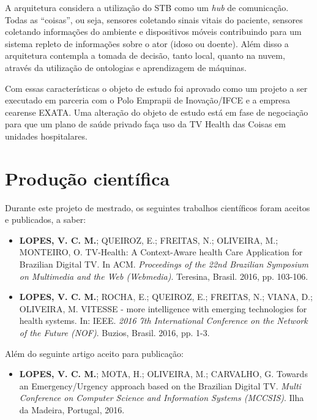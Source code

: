 A arquitetura considera a utilização do STB como um \textit{hub} de
comunicação. Todas as ``coisas'', ou seja, sensores coletando sinais vitais do
paciente, sensores coletando informações do ambiente e dispositivos móveis
contribuindo para um sistema repleto de informações sobre o ator (idoso
ou doente). Além disso a arquitetura contempla a tomada de decisão, tanto
local, quanto na nuvem, através da utilização de ontologias e aprendizagem de
máquinas.

Com essas características o objeto de estudo foi aprovado como um
projeto a ser executado em parceria com o Polo Emprapii de Inovação/IFCE e
a empresa cearense EXATA. Uma alteração do objeto de estudo
está em fase de negociação para que um plano de saúde privado faça uso 
da TV Health das Coisas em unidades hospitalares.

\section{Produção científica}\label{sec:producao}  

Durante este projeto de mestrado, os seguintes trabalhos científicos foram
aceitos e publicados, a saber:

\begin{itemize}
  \item \textbf{LOPES, V. C. M.}; QUEIROZ, E.; FREITAS, N.; OLIVEIRA, M.; MONTEIRO, O. TV-Health:
  A Context-Aware health Care Application for Brazilian Digital TV. In ACM.
  \textit{Proceedings of the 22nd Brazilian Symposium on Multimedia and the Web (Webmedia)}. 
  Teresina, Brasil. 2016, pp. 103-106.

  \item \textbf{LOPES, V. C. M.}; ROCHA, E.; QUEIROZ, E.; FREITAS, N.; VIANA, D.; OLIVEIRA, M. VITESSE 
  - more intelligence with emerging technologies for health systems. In: IEEE. 
  \textit{2016 7th International Conference on the Network of the Future (NOF)}. Buzios, Brasil. 2016, pp. 1-3.
\end{itemize}

Além do seguinte artigo aceito para publicação:

\begin{itemize}
  \item \textbf{LOPES, V. C. M.}; MOTA, H.; OLIVEIRA, M.; CARVALHO, G. Towards an Emergency/Urgency
    approach based on the Brazilian Digital TV. \textit{Multi Conference on Computer Science 
    and Information Systems (MCCSIS)}. Ilha da Madeira, Portugal, 2016.
\end{itemize}

